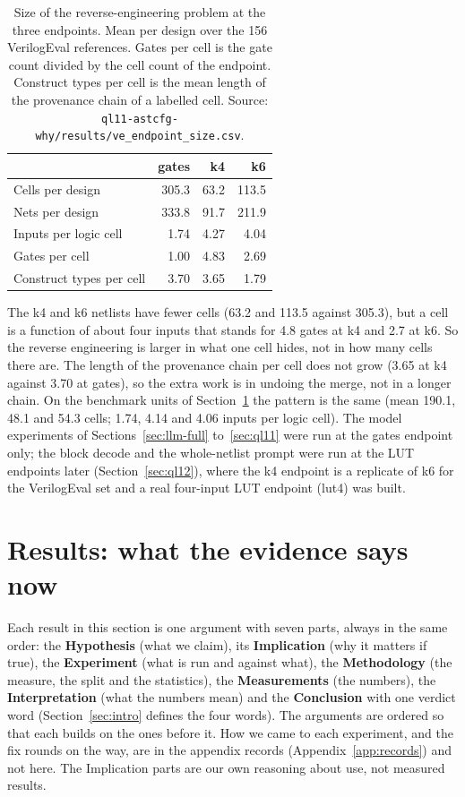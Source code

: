 \documentclass[conference]{IEEEtran}
\newcommand{\code}[1]{\texttt{#1}}
\begin{document}
\begin{table}[t]
\caption{Size of the reverse-engineering problem at the three endpoints. Mean per design over the 156 VerilogEval references. Gates per cell is the gate count divided by the cell count of the endpoint. Construct types per cell is the mean length of the provenance chain of a labelled cell. Source: \code{ql11-astcfg-why/}\allowbreak\code{results/}\allowbreak\code{ve\_endpoint\_size.csv}.}
\label{tab:endpoints}
\centering
\footnotesize
\begin{tabular}{@{}lrrr@{}}
\toprule
 & gates & k4 & k6 \\
\midrule
Cells per design & 305.3 & 63.2 & 113.5 \\
Nets per design & 333.8 & 91.7 & 211.9 \\
Inputs per logic cell & 1.74 & 4.27 & 4.04 \\
Gates per cell & 1.00 & 4.83 & 2.69 \\
Construct types per cell & 3.70 & 3.65 & 1.79 \\
\bottomrule
\end{tabular}
\end{table}

The k4 and k6 netlists have fewer cells (63.2 and 113.5 against 305.3), but a cell is a function of about four inputs that stands for 4.8 gates at k4 and 2.7 at k6. So the reverse engineering is larger in what one cell hides, not in how many cells there are. The length of the provenance chain per cell does not grow (3.65 at k4 against 3.70 at gates), so the extra work is in undoing the merge, not in a longer chain. On the benchmark units of Section~\ref{sec:results-main} the pattern is the same (mean 190.1, 48.1 and 54.3 cells; 1.74, 4.14 and 4.06 inputs per logic cell). The model experiments of Sections~\ref{sec:llm-full} to~\ref{sec:ql11} were run at the gates endpoint only; the block decode and the whole-netlist prompt were run at the LUT endpoints later (Section~\ref{sec:ql12}), where the k4 endpoint is a replicate of k6 for the VerilogEval set and a real four-input LUT endpoint (lut4) was built.

\section{Results: what the evidence says now}
\label{sec:results-main}

Each result in this section is one argument with seven parts, always in the same order: the \textbf{Hypothesis} (what we claim), its \textbf{Implication} (why it matters if true), the \textbf{Experiment} (what is run and against what), the \textbf{Methodology} (the measure, the split and the statistics), the \textbf{Measurements} (the numbers), the \textbf{Interpretation} (what the numbers mean) and the \textbf{Conclusion} with one verdict word (Section~\ref{sec:intro} defines the four words). The arguments are ordered so that each builds on the ones before it. How we came to each experiment, and the fix rounds on the way, are in the appendix records (Appendix~\ref{app:records}) and not here. The Implication parts are our own reasoning about use, not measured results.
\end{document}
